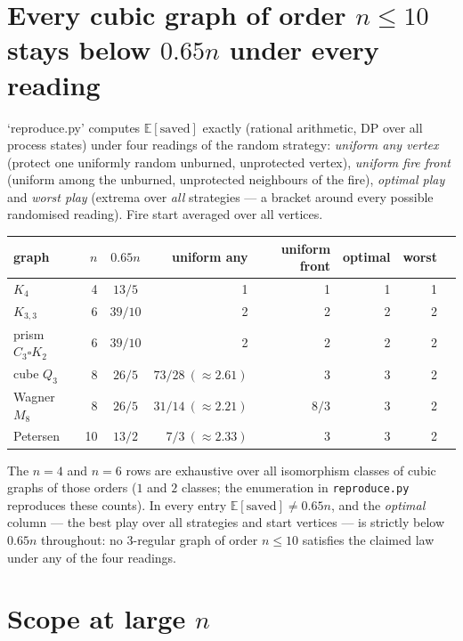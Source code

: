 \documentclass[11pt]{article}
\theoremstyle{plain}
\begin{document}
\section{Every cubic graph of order $n\le 10$ stays
below $0.65n$ under every reading}
\label{sec:table}

`reproduce.py' computes $\mathbb{E}[\text{saved}]$ exactly (rational
arithmetic, DP over all process states) under four readings of the random
strategy: \emph{uniform any vertex} (protect one uniformly random unburned,
unprotected vertex), \emph{uniform fire front} (uniform among the unburned,
unprotected neighbours of the fire), \emph{optimal play} and \emph{worst
play} (extrema over \emph{all} strategies --- a bracket around every possible
randomised reading).  Fire start averaged over all vertices.

\begin{center}
\begin{tabular}{lrcrrrrr}
\toprule
graph & $n$ & $0.65n$ & uniform any & uniform front & optimal & worst\\
\midrule
$K_4$            & 4  & $13/5$   & 1                & 1       & 1 & 1\\
$K_{3,3}$        & 6  & $39/10$  & 2                & 2       & 2 & 2\\
prism $C_3\square K_2$ & 6 & $39/10$ & 2            & 2       & 2 & 2\\
cube $Q_3$       & 8  & $26/5$   & $73/28\ (\approx2.61)$ & 3 & 3 & 2\\
Wagner $M_8$     & 8  & $26/5$   & $31/14\ (\approx2.21)$ & $8/3$ & 3 & 2\\
Petersen         & 10 & $13/2$   & $7/3\ (\approx2.33)$   & 3 & 3 & 2\\
\bottomrule
\end{tabular}
\end{center}

The $n=4$ and $n=6$ rows are exhaustive over all isomorphism classes of
cubic graphs of those orders ($1$ and $2$ classes; the enumeration in
\texttt{reproduce.py} reproduces these counts).  In every entry
$\mathbb{E}[\text{saved}] \ne 0.65n$, and the \emph{optimal} column --- the
best play over all strategies and start vertices --- is strictly below
$0.65n$ throughout: no 3-regular graph of order $n\le 10$ satisfies the
claimed law under any of the four readings.

\section{Scope at large $n$}
\end{document}
